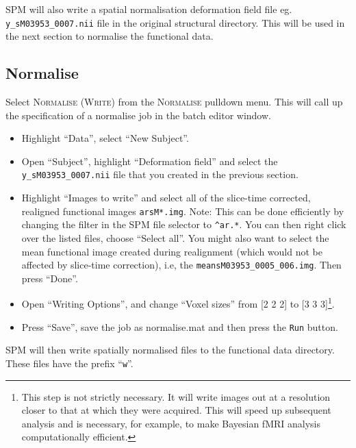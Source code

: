 SPM will also write a spatial normalisation deformation field file eg. \texttt{y\_sM03953\_0007.nii} file in the original structural directory. This will be used in the next section to normalise the functional data. 

\subsection{Normalise}

Select \textsc{Normalise (Write)} from the \textsc{Normalise} pulldown menu. This will call up the specification of a normalise job in the batch editor window. 

\begin{itemize}
\item Highlight ``Data'', select ``New Subject''.
\item Open ``Subject'', highlight ``Deformation field'' and select the \texttt{y\_sM03953\_0007.nii} file that you created in the previous section.
\item Highlight ``Images to write'' and select all of the slice-time corrected, realigned functional images \texttt{arsM*.img}. Note: This can be done efficiently by changing the filter in the SPM file selector to \texttt{\textasciicircum ar.*}. You can then right click over the listed files, choose ``Select all''. You might also want to select the mean functional image created during realignment (which would not be affected by slice-time correction), i.e, the \texttt{meansM03953\_0005\_006.img}. Then press ``Done''.
\item Open ``Writing Options'', and change ``Voxel sizes'' from [2 2 2] to [3 3 3]\footnote{This step is not strictly necessary. It will write images out at a resolution closer to that at which they were acquired. This will speed up subsequent analysis and is necessary, for example, to make Bayesian fMRI analysis computationally efficient.}.
\item Press ``Save'', save the job as normalise.mat and then press the \texttt{Run} button.
\end{itemize}
SPM will then write spatially normalised files to the functional data directory. These files have the prefix ``\texttt{w}''.


